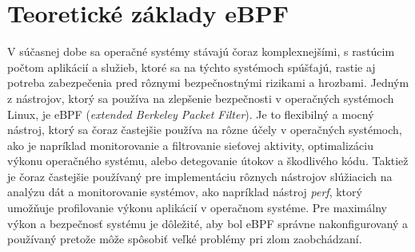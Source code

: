 \section{Teoretické základy eBPF}
V súčasnej dobe sa operačné systémy stávajú čoraz komplexnejšími, s rastúcim počtom aplikácií a služieb, ktoré sa na týchto systémoch spúšťajú, 
rastie aj potreba zabezpečenia pred rôznymi bezpečnostnými rizikami a hrozbami. Jedným z nástrojov, ktorý sa používa na zlepšenie bezpečnosti v 
operačných systémoch Linux, je eBPF (\emph{extended Berkeley Packet Filter}). Je to flexibilný a mocný nástroj, ktorý sa čoraz častejšie používa na 
rôzne účely v operačných systémoch, ako je napríklad monitorovanie a filtrovanie sieťovej aktivity, optimalizáciu výkonu operačného systému, 
alebo detegovanie útokov a škodlivého kódu. Taktiež je čoraz častejšie používaný pre implementáciu rôznych nástrojov slúžiacich na analýzu dát 
a monitorovanie systémov, ako napríklad nástroj \emph{perf}, ktorý umožňuje profilovanie výkonu aplikácií v operačnom systéme. Pre maximálny výkon a 
bezpečnosť systému je dôležité, aby bol eBPF správne nakonfigurovaný a používaný pretože môže spôsobiť veľké problémy pri zlom zaobchádzaní.~\cite{eBPF}

